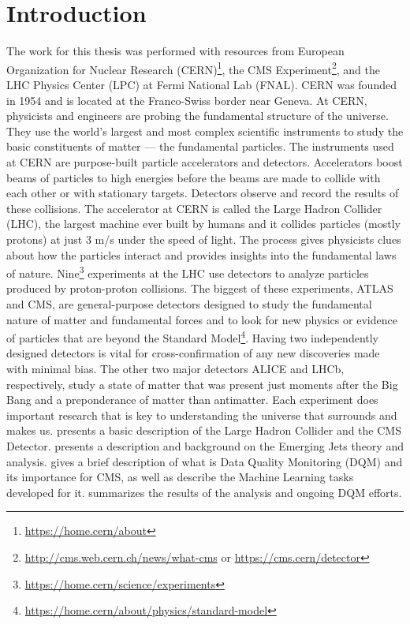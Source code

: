 \chapter{Introduction}

The work for this thesis was performed with resources from European Organization for Nuclear Research (CERN)\footnote{\url{https://home.cern/about}}, the CMS Experiment\footnote{\url{http://cms.web.cern.ch/news/what-cms} or \url{https://cms.cern/detector}}, and the LHC Physics Center (LPC) at Fermi National Lab (FNAL).
CERN was founded in 1954 and is located at the Franco-Swiss border near Geneva. At CERN, physicists and engineers are probing the fundamental structure of the universe. They use the world's largest and most complex scientific instruments to study the basic constituents of matter --- the fundamental particles.
The instruments used at CERN are purpose-built particle accelerators and detectors. Accelerators boost beams of particles to high energies before the beams are made to collide with each other or with stationary targets. Detectors observe and record the results of these collisions. The accelerator at CERN is called the Large Hadron Collider (LHC), the largest machine ever built by humans and it collides particles (mostly protons) at just
3 m/s under the speed of light.
The process gives physicists clues about how the particles interact and provides insights into the fundamental laws of nature. Nine\footnote{\url{https://home.cern/science/experiments}} experiments at the LHC use detectors to analyze particles produced by proton-proton collisions.
The biggest of these experiments, ATLAS and CMS, are general-purpose detectors designed to study the
fundamental nature of matter and fundamental forces and to look for new physics or evidence of particles that are beyond the Standard Model\footnote{\url{https://home.cern/about/physics/standard-model}}. Having two independently designed detectors is vital for cross-confirmation of any new discoveries made with minimal bias. The other two major detectors ALICE and LHCb, respectively, study a state of matter that was present just moments after the Big Bang and a preponderance of matter than antimatter.  Each experiment does important research that is key to understanding the universe that surrounds and makes us.
 presents a basic description of the Large Hadron Collider and the CMS Detector.
 presents a description and background on the Emerging Jets theory and analysis.
 gives a brief description of what is Data Quality Monitoring (DQM) and its importance for CMS, as well as describe the Machine Learning tasks developed for it.
 summarizes the results of the analysis and ongoing DQM efforts.
